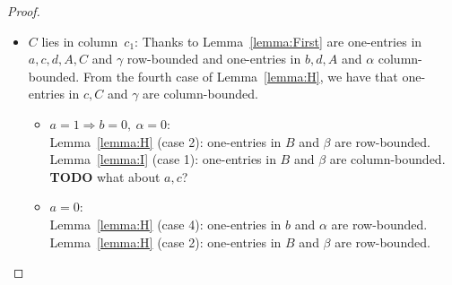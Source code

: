 \begin{proof}
\begin{itemize}
\item $C$ lies in column~$c_1$: Thanks to Lemma~\ref{lemma:First} are one-entries in $a,c,d,A,C$ and $\gamma$ row-bounded and one-entries in $b,d,A$ and $\alpha$ column-bounded. From the fourth case of Lemma~\ref{lemma:H}, we have that one-entries in $c,C$ and $\gamma$ are column-bounded.
	\begin{itemize}
		\item $a=1\Rightarrow b=0,\ \alpha=0$:\\
			Lemma~\ref{lemma:H} (case 2): one-entries in $B$ and $\beta$ are row-bounded.\\
			
			Lemma~\ref{lemma:I} (case 1): one-entries in $B$ and $\beta$ are column-bounded.\\
			\textbf{TODO} what about $a,c$?
		\item $a=0$:\\
			Lemma~\ref{lemma:H} (case 4): one-entries in $b$ and $\alpha$ are row-bounded.\\
			Lemma~\ref{lemma:H} (case 2): one-entries in $B$ and $\beta$ are row-bounded.\\
			

\end{itemize}
\end{itemize}
\end{proof}
